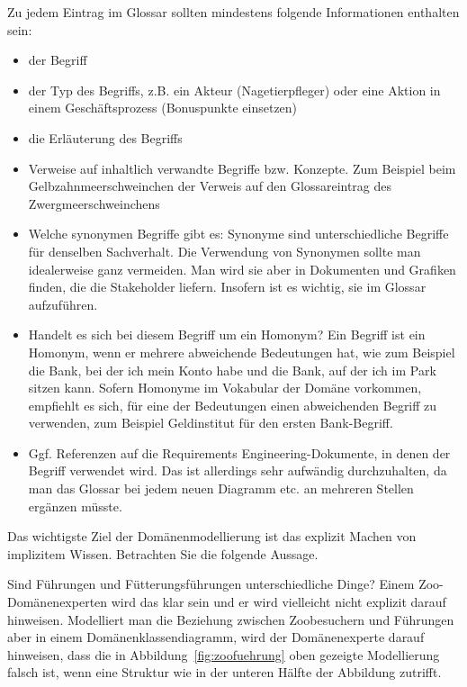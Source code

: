 Zu jedem Eintrag im Glossar sollten mindestens folgende Informationen enthalten sein:
\begin{itemize}
	\item der Begriff
	\item der Typ des Begriffs, z.B. ein Akteur (Nagetierpfleger) oder eine Aktion in einem Geschäftsprozess (Bonuspunkte einsetzen)
	\item die Erläuterung des Begriffs
	\item Verweise auf inhaltlich verwandte Begriffe bzw. Konzepte. Zum Beispiel beim Gelbzahnmeerschweinchen der Verweis auf den Glossareintrag des Zwergmeerschweinchens 
	\item Welche synonymen Begriffe gibt es: Synonyme sind unterschiedliche Begriffe für denselben Sachverhalt. Die Verwendung von Synonymen sollte man idealerweise ganz vermeiden. Man wird sie aber in Dokumenten und Grafiken finden, die die Stakeholder liefern. Insofern ist es wichtig, sie im Glossar aufzuführen.
	\item Handelt es sich bei diesem Begriff um ein Homonym? Ein Begriff ist ein \mbox{Homonym}, wenn er mehrere abweichende Bedeutungen hat, wie zum Beispiel die Bank, bei der ich mein Konto habe und die Bank, auf der ich im Park sitzen kann. Sofern Homonyme im Vokabular der Domäne vorkommen, empfiehlt es sich, für eine der Bedeutungen einen abweichenden Begriff zu verwenden, zum Beispiel Geldinstitut für den ersten Bank-Begriff.
	\item Ggf. Referenzen auf die Requirements Engineering-Dokumente, in denen der Begriff verwendet wird. Das ist allerdings sehr aufwändig durchzuhalten, da man das Glossar bei jedem neuen Diagramm etc. an mehreren Stellen ergänzen müsste.
\end{itemize}

\pagebreak %


Das wichtigste Ziel der Domänenmodellierung ist das explizit Machen von implizitem Wissen. Betrachten Sie die folgende Aussage.


\vspace{\baselineskip} %

Sind Führungen und Fütterungsführungen unterschiedliche Dinge? Einem Zoo-
\linebreak %
Domänenexperten wird das klar sein und er wird vielleicht nicht explizit darauf hinweisen. Modelliert man die Beziehung zwischen Zoobesuchern und Führungen aber in einem Domänenklassendiagramm, wird der Domänenexperte darauf hinweisen, dass die in Abbildung~\ref{fig:zoofuehrung} oben %
gezeigte Modellierung falsch ist, wenn eine Struktur wie in der unteren %
Hälfte der Abbildung zutrifft.

